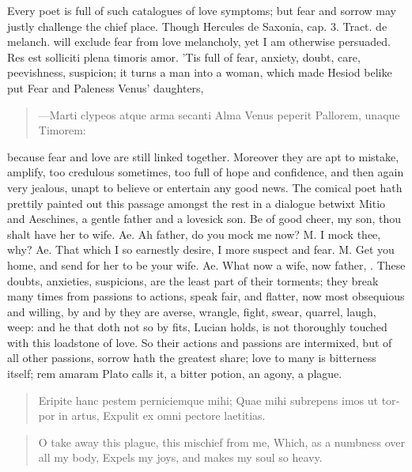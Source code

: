 Every poet is full of such catalogues of love symptoms; but fear and
sorrow may justly challenge the chief place. Though Hercules de
Saxonia, cap. 3. Tract. de melanch. will exclude fear from love
melancholy, yet I am otherwise persuaded. Res est solliciti plena
timoris amor. 'Tis full of fear, anxiety, doubt, care, peevishness,
suspicion; it turns a man into a woman, which made Hesiod belike put
Fear and Paleness Venus' daughters,

\begin{latin}
\begin{verse}
---Marti clypeos atque arma secanti
Alma Venus peperit Pallorem, unaque Timorem:
\end{verse}
\end{latin}

because fear and love are still linked together. Moreover they are apt
to mistake, amplify, too credulous sometimes, too full of hope and
confidence, and then again very jealous, unapt to believe or entertain
any good news. The comical poet hath prettily painted out this passage
amongst the rest in a dialogue betwixt Mitio and Aeschines, a
gentle father and a lovesick son. Be of good cheer, my son, thou shalt
have her to wife. Ae. Ah father, do you mock me now? M. I mock thee,
why? Ae. That which I so earnestly desire, I more suspect and fear. M.
Get you home, and send for her to be your wife. Ae. What now a wife,
now father, \etc{}. These doubts, anxieties, suspicions, are the least part
of their torments; they break many times from passions to actions,
speak fair, and flatter, now most obsequious and willing, by and by
they are averse, wrangle, fight, swear, quarrel, laugh, weep: and he
that doth not so by fits, Lucian holds, is not thoroughly touched
with this loadstone of love. So their actions and passions are
intermixed, but of all other passions, sorrow hath the greatest share;
love to many is bitterness itself; rem amaram Plato calls it, a
bitter potion, an agony, a plague.

\begin{latin}
\begin{verse}
Eripite hanc pestem perniciemque mihi;
Quae mihi subrepens imos ut torpor in artus,
Expulit ex omni pectore laetitias.
\end{verse}
\end{latin}
\translationrule%
\begin{verse}%
O take away this plague, this mischief from me,
Which, as a numbness over all my body,
Expels my joys, and makes my soul so heavy.
\end{verse}%

